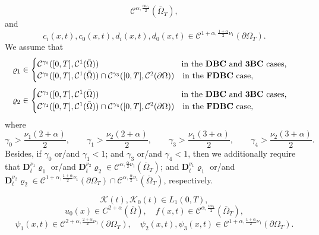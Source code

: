 \documentclass[reqno]{amsart}
\def\C {\mathcal{C}}
\theoremstyle{definition}
\numberwithin{equation}{section}
\begin{document}
\begin{description}
\begin{equation*}
    \C^{\alpha,\frac{\alpha\nu_{1}}{2}}(\bar{\Omega}_{T}),
    \end{equation*}
    and
    \begin{equation*}
 c_{i}(x,t),c_{0}(x,t), d_{i}(x,t),d_{0}(x,t)\in
    \C^{1+\alpha,\frac{1+\alpha}{2}\nu_{1}}(\partial\Omega_{T}).
    \end{equation*}
		We assume that
		\[
			\varrho_{1}\in
				\begin{cases}
				\C^{\gamma_{0}}([0,T],\C^{1}(\bar{\Omega}))\qquad\qquad\qquad\qquad\qquad\text{in the \textbf{DBC} and \textbf{3BC} cases,}
				\\
				\C^{\gamma_{0}}([0,T],\C^{1}(\bar{\Omega}))\cap \C^{\gamma_{3}}([0,T],\C^{2}(\partial\Omega))
								\quad \text{in the \textbf{FDBC} case,}
		\end{cases}
		\]
				\[
			\varrho_{2}\in
				\begin{cases}
				\C^{\gamma_{1}}([0,T],\C^{1}(\bar{\Omega}))\qquad\qquad\qquad\qquad\qquad \text{in the \textbf{DBC} and \textbf{3BC} cases,}
				\\
				\C^{\gamma_{1}}([0,T],\C^{1}(\bar{\Omega}))\cap \C^{\gamma_{4}}([0,T],\C^{2}(\partial\Omega))
								\quad \text{in the \textbf{FDBC} case,}
		\end{cases}
		\]
		where
		\[
		\gamma_{0}>\frac{\nu_{1}(2+\alpha)}{2},\qquad \gamma_1>\frac{\nu_{2}(2+\alpha)}{2},\qquad
		\gamma_{3}>\frac{\nu_{1}(3+\alpha)}{2},\qquad \gamma_4>\frac{\nu_{2}(3+\alpha)}{2}.
		\]
Besides,  if $\gamma_{0}$ or/and $\gamma_1<1$; and  $\gamma_{3}$ or/and $\gamma_4<1$, then  we additionally require that
 $\mathbf{D}_{t}^{\nu_{1}}\varrho_1$ or/and $\mathbf{D}_{t}^{\nu_2}\varrho_{2}\in\C^{\alpha,\frac{\alpha}{2}\nu_{1}}(\bar{\Omega}_{T})$; and
 $\mathbf{D}_{t}^{\nu_{1}}\varrho_1$  or/and $\mathbf{D}_{t}^{\nu_2}\varrho_2\in\C^{1+\alpha,\frac{1+\alpha}{2}\nu_{1}}(\partial\Omega_{T})\cap\C^{\alpha,\frac{\alpha}{2}\nu_{1}}(\bar{\Omega}_{T})$, respectively.

    \medskip
		     \item[H4. Conditions on the given functions]
       \begin{equation*}
			\mathcal{K}(t),
\mathcal{K}_{0}(t)\in L_{1}(0,T),
    \end{equation*}
    \begin{equation*}
u_{0}(x)\in C^{2+\alpha}(\bar{\Omega}), \quad
f(x,t)\in\C^{\alpha,\frac{\alpha\nu_{1}}{2}}(\bar{\Omega}_{T}),
    \end{equation*}
    \begin{equation*}
\psi_1(x,t)\in\C^{2+\alpha,\frac{2+\alpha}{2}\nu_{1}}(\partial\Omega_{T}),
    \quad
\psi_{2}(x,t),\psi_{3}(x,t)\in\C^{1+\alpha,\frac{1+\alpha}{2}\nu_{1}}(\partial\Omega_{T}).
    \end{equation*}


\end{description}
\end{document}
